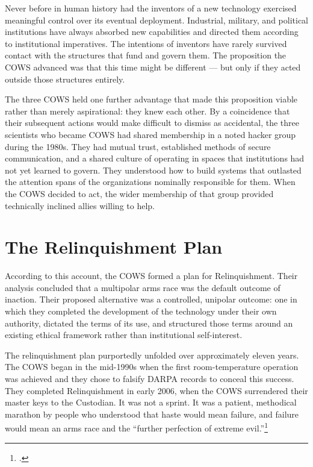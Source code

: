Never before in human history had the inventors of a new technology exercised meaningful control over its eventual deployment. Industrial, military, and political institutions have always absorbed new capabilities and directed them according to institutional imperatives. The intentions of inventors have rarely survived contact with the structures that fund and govern them. The proposition the COWS advanced was that this time might be different --- but only if they acted outside those structures entirely.

The three COWS held one further advantage that made this proposition viable rather than merely aspirational: they knew each other. By a coincidence that their subsequent actions would make difficult to dismiss as accidental, the three scientists who became COWS had shared membership in a noted hacker group during the 1980s. They had mutual trust, established methods of secure communication, and a shared culture of operating in spaces that institutions had not yet learned to govern. They understood how to build systems that outlasted the attention spans of the organizations nominally responsible for them. When the COWS decided to act, the wider membership of that group provided technically inclined allies willing to help.

\section*{The Relinquishment Plan}
\label{record:wo-relinquishment-plan}

According to this account, the COWS formed a plan for Relinquishment. Their analysis concluded that a multipolar arms race was the default outcome of inaction. Their proposed alternative was a controlled, unipolar outcome: one in which they completed the development of the technology under their own authority, dictated the terms of its use, and structured those terms around an existing ethical framework rather than institutional self-interest.

The relinquishment plan purportedly unfolded over approximately eleven years. The COWS began in the mid-1990s when the first room-temperature operation was achieved and they chose to falsify DARPA records to conceal this success. They completed Relinquishment in early 2006, when the COWS surrendered their master keys to the Custodian. It was not a sprint. It was a patient, methodical marathon by people who understood that haste would mean failure, and failure would mean an arms race and the ``further perfection of extreme evil.''\footcite{joy2000}

